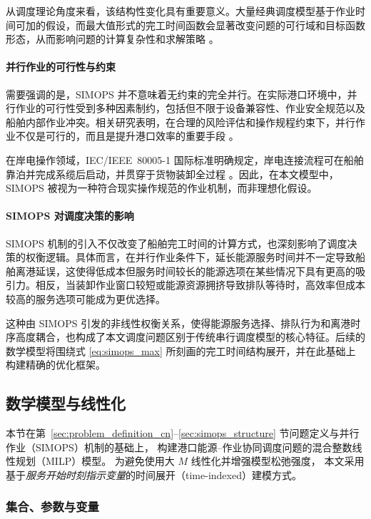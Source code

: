 \documentclass[UTF8, a4paper, 12pt]{ctexart}
\begin{document}
从调度理论角度来看，该结构性变化具有重要意义。大量经典调度模型基于作业时间可加的假设，而最大值形式的完工时间函数会显著改变问题的可行域和目标函数形态，从而影响问题的计算复杂性和求解策略 \cite{brucker2007scheduling,pinedo2016scheduling}。

\paragraph{并行作业的可行性与约束}
需要强调的是，SIMOPS 并不意味着无约束的完全并行。在实际港口环境中，并行作业的可行性受到多种因素制约，包括但不限于设备兼容性、作业安全规范以及船舶内部作业冲突。相关研究表明，在合理的风险评估和操作规程约束下，并行作业不仅是可行的，而且是提升港口效率的重要手段 \cite{Fan2021}。

在岸电操作领域，IEC/IEEE~80005-1 国际标准明确规定，岸电连接流程可在船舶靠泊并完成系缆后启动，并贯穿于货物装卸全过程 \cite{IEC80005}。因此，在本文模型中，SIMOPS 被视为一种符合现实操作规范的作业机制，而非理想化假设。

\paragraph{SIMOPS 对调度决策的影响}
SIMOPS 机制的引入不仅改变了船舶完工时间的计算方式，也深刻影响了调度决策的权衡逻辑。具体而言，在并行作业条件下，延长能源服务时间并不一定导致船舶离港延误，这使得低成本但服务时间较长的能源选项在某些情况下具有更高的吸引力。相反，当装卸作业窗口较短或能源资源拥挤导致排队等待时，高效率但成本较高的服务选项可能成为更优选择。

这种由 SIMOPS 引发的非线性权衡关系，使得能源服务选择、排队行为和离港时序高度耦合，也构成了本文调度问题区别于传统串行调度模型的核心特征。后续的数学模型将围绕式 \eqref{eq:simops_max} 所刻画的完工时间结构展开，并在此基础上构建精确的优化框架。


\subsection{数学模型与线性化}
\label{sec:model_formulation}

本节在第~\ref{sec:problem_definition_cn}--\ref{sec:simops_structure} 节问题定义与并行作业（SIMOPS）机制的基础上，
构建港口能源--作业协同调度问题的混合整数线性规划（MILP）模型。
为避免使用大 $M$ 线性化并增强模型松弛强度，
本文采用基于\emph{服务开始时刻指示变量}的时间展开（time-indexed）建模方式。
\subsubsection{集合、参数与变量}
\end{document}
